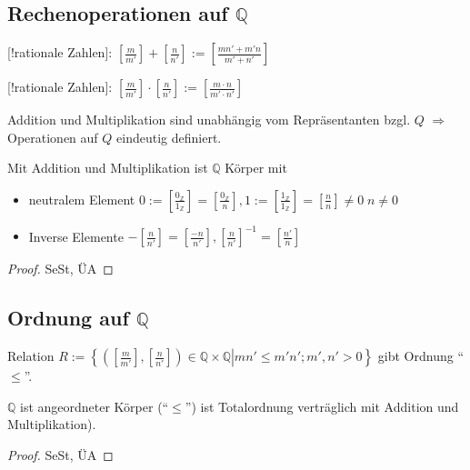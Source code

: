 \subsection{Rechenoperationen auf \texorpdfstring{$\mathbb{Q}$}{Q}}
\begin{*definition}
	[!rationale Zahlen]: $\left[ \frac{m}{m'}\right] + \left[ \frac{n}{n'}\right] := \left[ \frac{mn' + m'n}{m'+n'}\right]$
	
	[!rationale Zahlen]: $\left[\frac{m}{m'}\right]\cdot\left[\frac{n}{n'}\right]:=\left[\frac{m\cdot n}{m'\cdot n'}\right]$
	
	Addition und Multiplikation sind unabhängig vom Repräsentanten bzgl. $Q$ $\Rightarrow$ Operationen auf $Q$ eindeutig definiert.
\end{*definition}

\begin{proposition}
	Mit Addition und Multiplikation ist $\mathbb{Q}$ Körper mit
	\begin{itemize}
	\item neutralem Element $0:=\left[\frac{0_\mathbb{Z}}{1_\mathbb{Z}}\right] = \left[\frac{0_\mathbb{Z}}{n}\right], 1 :=\left[\frac{1_\mathbb{Z}}{1_\mathbb{Z}}\right] = \left[ \frac{n}{n}\right] \neq 0\;n\neq 0$
	\item Inverse Elemente $-\left[\frac{n}{n'}\right] = \left[ \frac{-n}{n'}\right], \left[\frac{n}{n'}\right]^{-1} = \left[\frac{n'}{n}\right]$
	\end{itemize}
\end{proposition}
\begin{proof}
	SeSt, ÜA
\end{proof}

\subsection{Ordnung auf \texorpdfstring{$\mathbb{Q}$}{Q}}
\begin{*definition}
	Relation $R:=\left\lbrace \left. \left( \left[\frac{m}{m'}\right],\left[\frac{n}{n'}\right]\right)\in\mathbb{Q}\times\mathbb{Q} \right| mn'\le m'n'; m',n'>0\right\rbrace$ gibt Ordnung "`$\le$"'.
\end{*definition}

\begin{proposition}
	$\mathbb{Q}$ ist angeordneter Körper ("`$\leq$"') ist Totalordnung verträglich mit Addition und Multiplikation).
\end{proposition}
\begin{proof}
	SeSt, ÜA
\end{proof}

